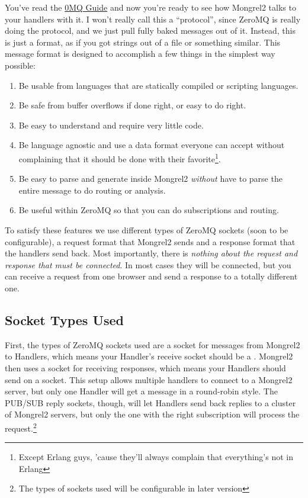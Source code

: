 You've read the \href{http://zguide.zeromq.org/page:all}{0MQ Guide} and now you're
ready to see how Mongrel2 talks to your handlers with it.  I won't really call this a ``protocol'',
since ZeroMQ is really doing the protocol, and we just pull fully baked messages out of it.  Instead,
this is just a format, as if you got strings out of a file or something similar.  This message
format is designed to accomplish a few things in the simplest way possible:

\begin{enumerate}
\item Be usable from languages that are statically compiled or scripting languages.
\item Be safe from buffer overflows if done right, or easy to do right.
\item Be easy to understand and require very little code.
\item Be language agnostic and use a data format everyone can accept without complaining
    that it should be done with their favorite\footnote{Except Erlang guys, 'cause they'll always
    complain that everything's not in Erlang}.
\item Be easy to parse and generate inside Mongrel2 \emph{without} have to parse the entire message
    to do routing or analysis.
\item Be useful within ZeroMQ so that you can do subscriptions and routing.
\end{enumerate}

To satisfy these features we use different types of ZeroMQ sockets (soon to be configurable),
a request format that Mongrel2 sends and a response format that the handlers send back.  Most
importantly, there is \emph{nothing about the request and response that must be connected}.  In most
cases they will be connected, but you can receive a request from one browser and send a response
to a totally different one.

\subsection{Socket Types Used}

First, the types of ZeroMQ sockets used are a  socket
for messages from Mongrel2 to Handlers, which means your Handler's receive
socket should be a .  Mongrel2 then uses a
 socket for receiving responses, which means your Handlers
should send on a  socket.  This setup
allows multiple handlers to connect to a Mongrel2 server, but only
one Handler will get a message in a round-robin style.  The PUB/SUB reply
sockets, though, will let Handlers send back replies to a cluster of
Mongrel2 servers, but only the one with the right subscription will
process the request.\footnote{The types of sockets used will be configurable
in later version}

